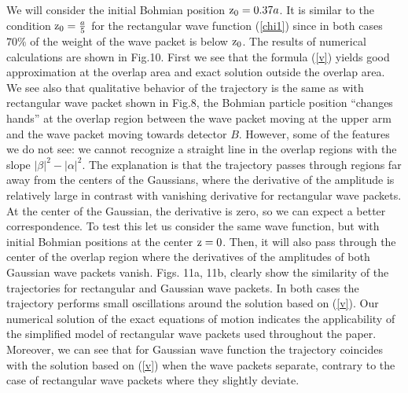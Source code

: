 \documentclass[preprint,tightenlines]{elsarticle}
\begin{document}
\vspace{-10pt}
 We will consider the initial Bohmian position ${\rm z}_{0}=0.37a$.
It is similar to the condition ${\rm z}_{0}=\frac{a}{5}$ for the
rectangular wave function (\ref{chi1}) since in both cases $70\%$
of the weight of the wave packet is below ${\rm z}_{0}$. The results
of numerical calculations are shown in Fig.10. First we see that the formula (\ref{v}) yields good approximation at the overlap area and exact solution outside the overlap area.
We see also that qualitative
behavior of the trajectory is the same as with rectangular wave packet
shown in Fig.8, the Bohmian particle position ``changes hands''
at the overlap region between the wave packet moving at the upper arm and the wave packet moving towards detector $B$. However,
some of the features we do not see: we cannot recognize a straight
line in the overlap regions with the slope $|\beta|^{2}-|\alpha|^{2}$.
The explanation is that  the trajectory passes through regions
far away from the centers of the Gaussians, where the derivative of
the amplitude is relatively large in contrast with vanishing derivative for  rectangular wave packets. At the center of the Gaussian,
the derivative is zero, so we can expect a better correspondence.
To test this let us consider the same wave function, but with initial
 Bohmian positions at the center ${\rm z}=0$. Then, it
will also pass through the center of the overlap region where the
derivatives of the amplitudes of both Gaussian wave packets vanish.
Figs. 11a, 11b, clearly show the similarity of the trajectories for rectangular
and Gaussian wave packets.  In both cases the trajectory performs small oscillations
around the solution based on (\ref{v}). Our numerical solution of the exact equations of motion
indicates the applicability  of the simplified model of rectangular wave
packets used throughout the paper. Moreover, we can see that for Gaussian wave function the  trajectory
coincides with the solution based on (\ref{v}) when  the wave packets separate, contrary to the case of  rectangular wave
packets where they  slightly deviate.
\end{document}

